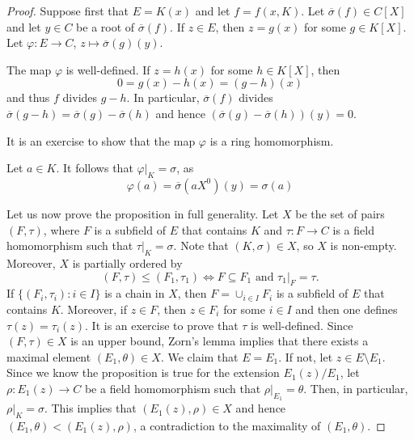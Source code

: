 \begin{proof}
	Suppose first that $E=K(x)$ and let $f=f(x,K)$. Let $\overline{\sigma}(f)\in C[X]$ 
	and let $y\in C$ be a root of $\overline{\sigma}(f)$. If $z\in E$, then $z=g(x)$ for
	some $g\in K[X]$. Let $\varphi\colon E\to C$, $z\mapsto \overline{\sigma}(g)(y)$. 

	The map $\varphi$ is well-defined. If $z=h(x)$ for some $h\in K[X]$, then
	\[
	0=g(x)-h(x)=(g-h)(x)
	\]
	and thus $f$ divides $g-h$. In particular, $\overline{\sigma}(f)$ divides
    $\overline{\sigma}(g-h)=\overline{\sigma}(g)-\overline{\sigma}(h)$ and hence
    $(\overline{\sigma}(g)-\overline{\sigma}(h))(y)=0$. 

	It is an exercise to show that the map $\varphi$ is a ring homomorphism.
	
	Let $a\in K$. It follows that $\varphi|_K=\sigma$, as 
	\[
	\varphi(a)=\overline{\sigma}(aX^0)(y)=\sigma(a)
	\]
	
	Let us now prove the proposition in full generality. Let 
	$X$ be the set of pairs $(F,\tau)$, where $F$ is a subfield of $E$ that contains $K$ and
	$\tau\colon F\to C$ is a field homomorphism such that $\tau|_K=\sigma$. Note that
	$(K,\sigma)\in X$, so $X$ is non-empty. Moreover, $X$ is partially ordered by
	\[
	(F,\tau)\leq (F_1,\tau_1)\Longleftrightarrow F\subseteq F_1\text{ and }\tau_1|_F=\tau.
	\]
	If $\{(F_i,\tau_i):i\in I\}$ is a chain in $X$, then $F=\cup_{i\in I}F_i$ is a subfield of $E$
	that contains $K$. Moreover, if $z\in F$, then $z\in F_i$ for some $i\in I$ and 
	then one defines $\tau(z)=\tau_i(z)$. It is an exercise to prove that $\tau$ is well-defined.
	Since $(F,\tau)\in X$ is an upper bound, Zorn's lemma implies that there exists
	a maximal element 
	$(E_1,\theta)\in X$. We claim that $E=E_1$. If not, let $z\in E\setminus E_1$. 
	Since we know the proposition is true for the extension $E_1(z)/E_1$, 
	let  
	$\rho\colon E_1(z)\to C$ be a field homomorphism such that $\rho|_{E_1}=\theta$. Then, in particular, 
	$\rho|_K=\sigma$. This implies that $(E_1(z),\rho)\in X$ and hence
	$(E_1,\theta)<(E_1(z),\rho)$, a contradiction to the maximality of $(E_1,\theta)$. 
\end{proof}

